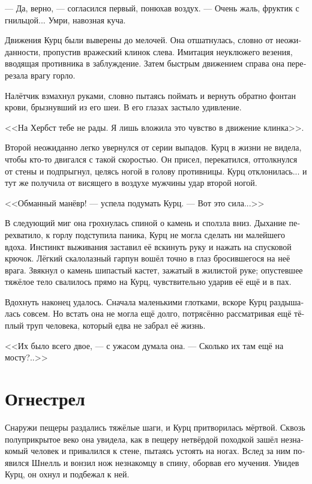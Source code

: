 \documentclass[a4paper,10pt,fleqn]{book}\usepackage{polyglossia}\setdefaultlanguage[babelshorthands=true]{russian}\setotherlanguage{english}\defaultfontfeatures{Ligatures=TeX,Mapping=tex-text}\usepackage{xcolor}\newcommand{\ml}[3]{#2}
\begin{document}
--- Да, верно, --- согласился первый, понюхав воздух.
--- Очень жаль, фруктик с гнильцой...
Умри, навозная куча.

Движения Курц были выверены до мелочей.
Она отшатнулась, словно от неожиданности, пропустив вражеский клинок слева.
Имитация неуклюжего везения, вводящая противника в заблуждение.
Затем быстрым движением справа она перерезала врагу горло.

Налётчик взмахнул руками, словно пытаясь поймать и вернуть обратно фонтан крови, брызнувший из его шеи.
В его глазах застыло удивление.

<<На Хербст тебе не рады.
Я лишь вложила это чувство в движение клинка>>.

Второй неожиданно легко увернулся от серии выпадов.
Курц в жизни не видела, чтобы кто-то двигался с такой скоростью.
Он присел, перекатился, оттолкнулся от стены и подпрыгнул, целясь ногой в голову противницы.
Курц отклонилась... и тут же получила от висящего в воздухе мужчины удар второй ногой.

<<Обманный манёвр! --- успела подумать Курц.
--- Вот это сила...>>

В следующий миг она грохнулась спиной о камень и сползла вниз.
Дыхание перехватило, к горлу подступила паника, Курц не могла сделать ни малейшего вдоха.
Инстинкт выживания заставил её вскинуть руку и нажать на спусковой крючок.
Лёгкий скалолазный гарпун вошёл точно в глаз бросившегося на неё врага.
Звякнул о камень шипастый кастет, зажатый в жилистой руке;
опустевшее тяжёлое тело свалилось прямо на Курц, чувствительно ударив её ещё и в пах.

Вдохнуть наконец удалось.
Сначала маленькими глотками, вскоре Курц раздышалась совсем.
Но встать она не могла ещё долго, потрясённо рассматривая ещё тёплый труп человека, который едва не забрал её жизнь.

<<Их было всего двое, --- с ужасом думала она.
--- Сколько их там ещё на мосту?..>>

\section{Огнестрел}

Снаружи пещеры раздались тяжёлые шаги, и Курц притворилась мёртвой.
Сквозь полуприкрытое веко она увидела, как в пещеру нетвёрдой походкой зашёл незнакомый человек и привалился к стене, пытаясь устоять на ногах.
Вслед за ним появился Шнелль и вонзил нож незнакомцу в спину, оборвав его мучения.
Увидев Курц, он охнул и подбежал к ней.
\end{document}
